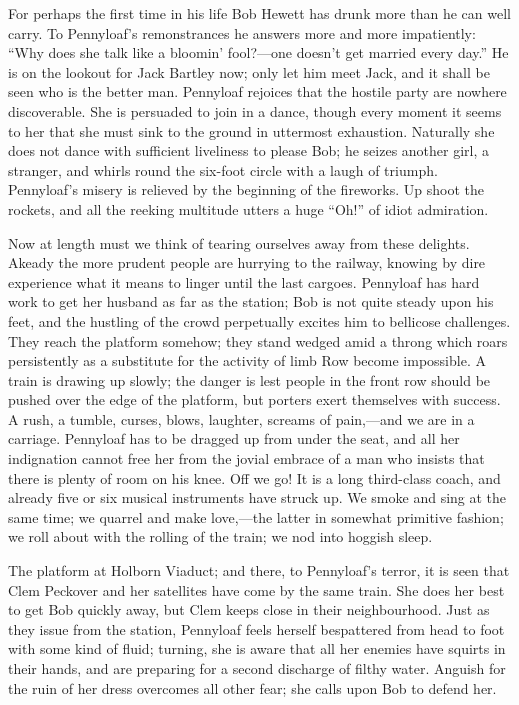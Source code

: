 For perhaps the first time in his life Bob Hewett has drunk more than he
can well carry. To Pennyloaf's remonstrances he answers more and more
impatiently: ``Why does she talk like a bloomin' fool?---one doesn't get
married every day.'' He is on the {\protect\hypertarget{270}{}{}}lookout
for Jack Bartley now; only let him meet Jack, and it shall be seen who
is the better man. Pennyloaf rejoices that the hostile party are nowhere
discoverable. She is persuaded to join in a dance, though every moment
it seems to her that she must sink to the ground in uttermost
exhaustion. Naturally she does not dance with sufficient liveliness to
please Bob; he seizes another girl, a stranger, and whirls round the
six-foot circle with a laugh of triumph. Pennyloaf's misery is relieved
by the beginning of the fireworks. Up shoot the rockets, and all the
reeking multitude utters a huge ``Oh!'' of idiot admiration.

Now at length must we think of tearing ourselves away from these
delights. Akeady the more prudent people are hurrying to the railway,
knowing by dire experience what it means to linger until the last
cargoes. Pennyloaf has hard work to get her husband as far as the
station; Bob is not quite steady upon his feet, and the hustling of the
crowd perpetually excites him to bellicose challenges.
{\protect\hypertarget{271}{}{}}They reach the platform somehow; they
stand wedged amid a throng which roars persistently as a substitute for
the activity of limb Row become impossible. A train is drawing up
slowly; the danger is lest people in the front row should be pushed over
the edge of the platform, but porters exert themselves with success. A
rush, a tumble, curses, blows, laughter, screams of pain,---and we are
in a carriage. Pennyloaf has to be dragged up from under the seat, and
all her indignation cannot free her from the jovial embrace of a man who
insists that there is plenty of room on his knee. Off we go! It is a
long third-class coach, and already five or six musical instruments have
struck up. We smoke and sing at the same time; we quarrel and make
love,---the latter in somewhat primitive fashion; we roll about with the
rolling of the train; we nod into hoggish sleep.

The platform at Holborn Viaduct; and there, to Pennyloaf's terror, it is
seen that Clem Peckover and her satellites have come
{\protect\hypertarget{272}{}{}}by the same train. She does her best to
get Bob quickly away, but Clem keeps close in their neighbourhood. Just
as they issue from the station, Pennyloaf feels herself bespattered from
head to foot with some kind of fluid; turning, she is aware that all her
enemies have squirts in their hands, and are preparing for a second
discharge of filthy water. Anguish for the ruin of her dress overcomes
all other fear; she calls upon Bob to defend her.

